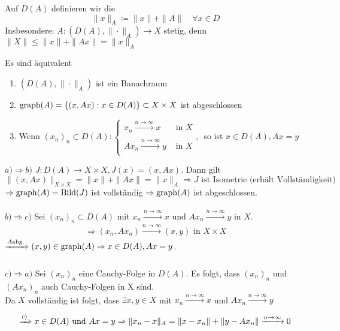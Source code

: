 \begin{definition}
	Auf $D(A)$ definieren wir die 
	\[ \| x \|_{A} \coloneqq \|x \| + \| A \| \quad \forall x \in D \]
	Insbesondere: $A: (D(A), \| \cdot \|_{A}) \rightarrow X$ stetig, denn $\| X \| \leq \|x \| + \| A x \| = \| x \|_{A}$
\end{definition}


\begin{satz} \label{satz:12.3}
	Es sind äquivalent
	\begin{enumerate}[label=\alph*\upshape)]
		\item $\left( D(A), \| \cdot \|_{A} \right)$ ist ein Banachraum
		\item $\operatorname{graph}(A) = \{ (x, A x): x \in D(A) \} \subset X \times X$ ist abgeschlossen
		\item Wenn $(x_{n})_{n} \subset D(A): \begin{cases}
			x_{n} \xrightarrow[]{n \rightarrow \infty} x & \text{ in } X \\ A x_{n} \xrightarrow[]{n \rightarrow \infty} y & \text{ in } X \end{cases}$, $ $ so ist $x \in D(A), A x = y$
	\end{enumerate}
\end{satz}

\begin{beweis}
	$a) \Rightarrow b)$ $J: D(A) \rightarrow X \times X, J(x) = (x, Ax)$. Dann gilt
		\[ \| (x, Ax) \|_{X \times X} = \| x \| + \| A x \| = \| x \|_{A} \Rightarrow J \text{ ist Isometrie (erhält Vollständigkeit)}  \]
		$\Rightarrow \operatorname{graph}(A) = \mathop{\rm Bild}\nolimits(J)$ ist vollständig $\Rightarrow \operatorname{graph}(A)$ ist abgeschlossen. \\ \\
	$b) \Rightarrow c)$ Sei $(x_{n})_{n} \subset D(A)$ mit $x_{n} \xrightarrow[]{n \rightarrow \infty} x$ und $Ax_{n} \xrightarrow[]{n \rightarrow \infty} y$ in $X$.
		\[ \Rightarrow (x_{n}, A x_{n}) \xrightarrow[]{n \rightarrow \infty} (x, y) \text{ in } X \times X \]
		$\xRightarrow[]{A \text{abg.}} (x, y) \in \operatorname{graph}(A) \Rightarrow x \in D(A), Ax = y$. \\ \\
	$c) \Rightarrow a)$ Sei $(x_{n})_{n}$ eine Cauchy-Folge in $D(A)$. Es folgt, dass $(x_{n})_{n}$ und $(A x_{n})_{n}$ auch Cauchy-Folgen in X sind. \\
	Da $X$ vollständig ist folgt, dass  $\exists x, y \in X$ mit $x_{n} \xrightarrow[]{n \rightarrow \infty} x$ und $A x_{n} \xrightarrow[]{n \rightarrow \infty} y$ \\
	\[ \xRightarrow[]{c)} x \in D(A) \text{ und } A x = y \Rightarrow \|x_{n} - x \|_{A} = \| x - x_{n} \| + \| y - A x_{n} \| \xrightarrow[]{n \rightarrow \infty} 0 \]
\end{beweis}


